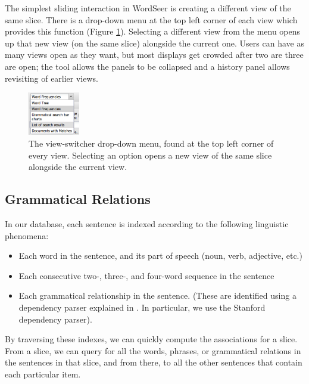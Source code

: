 \documentclass{sig-alternate}
\begin{document}
The simplest sliding interaction in WordSeer is creating a different view of the same slice.  There is a drop-down menu at the top left corner of each view which provides this function (Figure \ref{fig:chris03}).  Selecting a different view from the menu opens up that new view (on the same slice) alongside the current one. Users can have as many views open as they want, but most displays get crowded after two are three are open; the tool allows the panels to be collapsed and a history panel allows revisiting of earlier views.  
\begin{figure}[h!]
\includegraphics[width=0.2\textwidth]{fig/chris/03.png}
\caption{ The view-switcher drop-down menu, found at the top left corner of every view. Selecting an option opens a new view  of the same slice alongside the current view. \label{fig:chris03}}
\end{figure}


\subsection{Grammatical Relations}


 In our database, each sentence is indexed according to the following linguistic phenomena:
\begin{itemize}
  \item Each word in the sentence, and its part of speech (noun, verb, adjective, etc.)
  \item Each consecutive two-, three-, and four-word sequence in the sentence
  \item Each grammatical relationship in the sentence. (These are identified using a dependency parser  explained in \cite{jurafsky_chapter_2009}. In particular, we use the Stanford dependency parser\cite{klein_accurate_2003}).
\end{itemize}

By traversing these indexes, we can quickly compute the associations for a slice. From a slice, we can query for all the words, phrases, or grammatical relations in the sentences in that slice, and from there, to all the other sentences that contain each particular item.  
\end{document}

